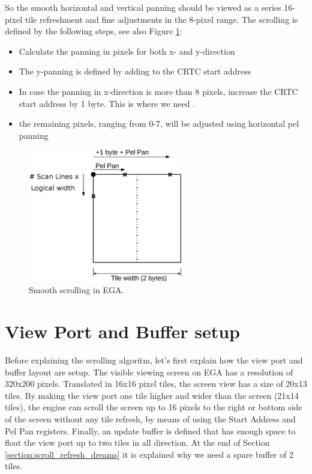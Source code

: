 \documentclass[book.tex]{subfiles}
\begin{document}
So the smooth horizontal and vertical panning should be viewed as a series 16-pixel tile refreshment and fine adjustments in the 8-pixel range. The scrolling is defined by the following steps, see also Figure \ref{fig:tile_refresh}:
\begin{itemize}
  \item Calculate the panning in pixels for both x- and y-direction
  \item The y-panning is defined by adding  to the CRTC start address
  \item In case the panning in x-direction is more than 8 pixels, increase the CRTC start address by 1 byte. This is where we need .
  \item the remaining pixels, ranging from 0-7, will be adjusted using horizontal pel panning
\end{itemize}


\begin{figure}[H]
\centering
\includegraphics[width=0.6\textwidth]{imgs/drawings/Tile_Refresh.eps}
\caption{Smooth scrolling in EGA.}
\label{fig:tile_refresh}
\end{figure}





\section{View Port and Buffer setup}
Before explaining the scrolling algoritm, let's first explain how the view port and buffer layout are setup. The visible viewing screen on EGA has a resolution of 320x200 pixels. Translated in 16x16 pixel tiles, the screen view has a size of 20x13 tiles. By making the view port one tile higher and wider than the screen (21x14 tiles), the engine can scroll the screen up to 16 pixels to the right or bottom side of the screen without any tile refresh, by means of using the Start Address and Pel Pan registers. Finally, an update buffer is defined that has enough space to float the view port up to two tiles in all direction. At the end of Section \ref{section:scroll_refresh_dreams} it is explained why we need a spare buffer of 2 tiles.\\
\end{document}
